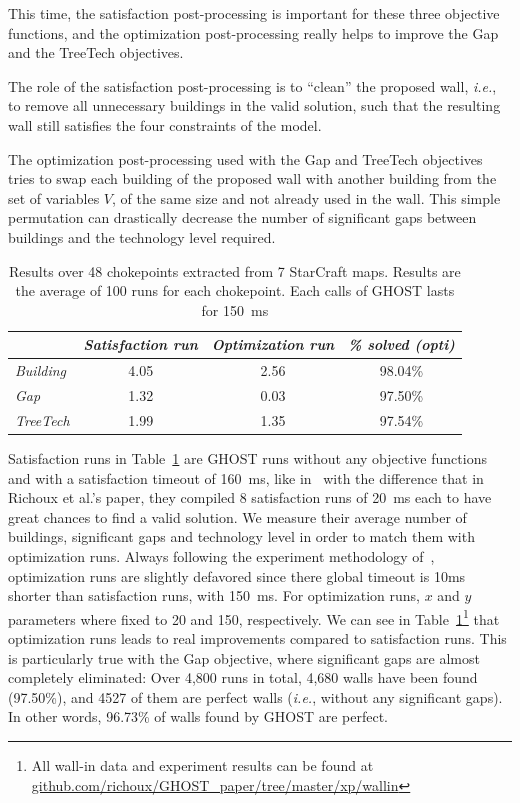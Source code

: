 \documentclass[journal]{IEEEtran}
\newcommand{\ghost}{\textsc{GHOST}\xspace}
\newcommand{\ie}{\textit{i.e.}}
\begin{document}
This  time, the  satisfaction post-processing  is important  for these
three objective functions, and the optimization post-processing really
helps to improve the Gap and the TreeTech objectives.

The  role of  the  satisfaction post-processing  is  to ``clean''  the
proposed wall, \ie,  to remove all unnecessary buildings  in the valid
solution,  such  that the  resulting  wall  still satisfies  the  four
constraints of the model.

The  optimization  post-processing  used  with the  Gap  and  TreeTech
objectives  tries to  swap each  building  of the  proposed wall  with
another building from  the set of variables $V$, of  the same size and
not already used in the  wall. This simple permutation can drastically
decrease  the number  of significant  gaps between  buildings and  the
technology level required.

\begin{table}[ht]
  \caption{Results  over 48  chokepoints  extracted  from 7  StarCraft
    maps. Results  are the  average of 100  runs for  each chokepoint.
    Each calls of \ghost lasts for 150~ms} 
    \label{tab:wall}
    \centering
    \begin{tabular}{|l|c|c|c|}
      \cline{2-4}
      \multicolumn{1}{c|}{}   &    {\em   Satisfaction    run}&   {\em
        Optimization run}& {\em \% solved (opti)} \\
      \hline
      {\em Building} & 4.05 & 2.56 & 98.04\% \\
      {\em Gap} & 1.32 & 0.03 & 97.50\% \\ 
      {\em TreeTech} & 1.99 & 1.35 & 97.54\% \\ 
      \hline
    \end{tabular}  
\end{table}
Satisfaction runs in Table~\ref{tab:wall}  are \ghost runs without any
objective functions  and with  a satisfaction  timeout of  160~ms, like
in~\cite{RichouxUO14}  with the  difference that  in Richoux  et al.'s
paper, they  compiled 8 satisfaction runs  of 20~ms each to  have great
chances to find  a valid solution. We measure their  average number of
buildings, significant  gaps and  technology level  in order  to match
them  with   optimization  runs.   Always  following   the  experiment
methodology  of~\cite{RichouxUO14},  optimization  runs  are  slightly
defavored since there global timeout is 10ms shorter than satisfaction
runs, with 150~ms. For optimization  runs, $x$ and $y$ parameters where
fixed   to    20   and   150,    respectively.    We   can    see   in
Table~\ref{tab:wall}\footnote{All wall-in data  and experiment results
  can                   be                  found                   at
  \href{https://github.com/richoux/GHOST\_paper/tree/master/xp/wallin}{github.com/richoux/GHOST\_paper/tree/master/xp/wallin}}
that  optimization  runs  leads   to  real  improvements  compared  to
satisfaction runs. This  is particularly true with  the Gap objective,
where significant  gaps are  almost completely eliminated:  Over 4,800
runs in total, 4,680 walls have been found (97.50\%), and 4527 of them
are perfect walls (\ie, without any significant gaps). In other words,
96.73\% of walls found by \ghost are perfect.
\end{document}
